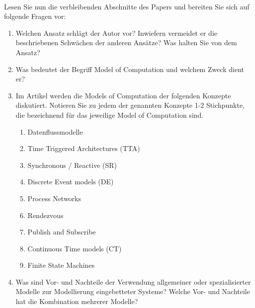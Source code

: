\\
Lesen Sie nun die verbleibenden Abschnitte des Papers \cite{lee2002embedded} und bereiten Sie sich auf folgende Fragen vor: 
\begin{enumerate}
    \item Welchen Ansatz schlägt der Autor vor? Inwiefern vermeidet er die beschriebenen Schwächen der anderen Ansätze? Was halten Sie von dem Ansatz?
    \item Was bedeutet der Begriff Model of Computation und welchem Zweck dient er?
    \item Im Artikel werden die Models of Computation der folgenden Konzepte diskutiert. Notieren Sie zu jedem der genannten Konzepte 1-2 Stichpunkte, die bezeichnend für das jeweilige Model of Computation sind.
    \begin{enumerate}
        \item Datenflussmodelle
        \item Time Triggered Architectures (TTA)
        \item Synchronous / Reactive (SR)
        \item Discrete Event models (DE)
        \item Process Networks
        \item Rendezvous
        \item Publish and Subscribe
        \item Continuous Time models (CT) 
        \item Finite State Machines
    \end{enumerate}
    \item Was sind Vor- und Nachteile der Verwendung allgemeiner oder spezialisierter Modelle zur Modellierung eingebetteter Systeme? Welche Vor- und Nachteile hat die Kombination mehrerer Modelle?
\end{enumerate}

